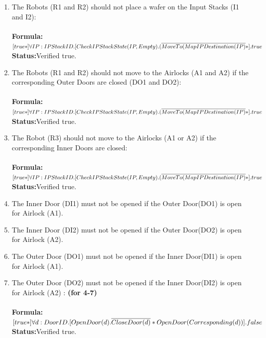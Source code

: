 \documentclass[a4paper,12pt]{article}
\begin{document}
\begin{enumerate}
		
		\item The Robots (R1 and R2) should not place a wafer on the Input Stacks (I1 and I2):
		\\
		\\\textbf{Formula:} $[true*] \forall IP: IPStackID.[CheckIPStackState(IP, Empty).
		\\(\overline{MoveTo(MapIPDestination(IP)}*].true$ \\\textbf{Status:}Verified true.
		
		
		\item The Robots (R1 and R2) should not move to the Airlocks (A1 and A2) if the corresponding Outer Doors are closed (DO1 and DO2):
		\\
		\\\textbf{Formula:} $[true*] \forall IP: IPStackID.[CheckIPStackState(IP, Empty).
		\\(\overline{MoveTo(MapIPDestination(IP)}*].true$ \\\textbf{Status:}Verified true.
		
		
		\item The Robot (R3) should not move to the Airlocks (A1 or A2) if the corresponding Inner Doors are closed:
		\\
		\\\textbf{Formula:} $[true*] \forall IP: IPStackID.[CheckIPStackState(IP, Empty).
		\\(\overline{MoveTo(MapIPDestination(IP)}*].true$ \\\textbf{Status:}Verified true.
		
		
		\item The Inner Door (DI1) must not be opened if the Outer Door(DO1) is open for Airlock (A1).
		
		
		\item The Inner Door (DI2) must not be opened if the Outer Door(DO2) is open for Airlock (A2).
		
		
		\item The Outer Door (DO1) must not be opened if the Inner Door(DI1) is open for Airlock (A1).
		
		
		\item The Outer Door (DO2) must not be opened if the Inner Door(DI2) is open for Airlock (A2) : \textbf{(for 4-7)} 
		\\
		\\\textbf{Formula:} $[true*] \forall d: DoorID.[OpenDoor(d).\overline{CloseDoor(d)}*
		\\OpenDoor(Corresponding(d))].false$ 
		\\\textbf{Status:}Verified true.
		

\end{enumerate}
\end{document}
